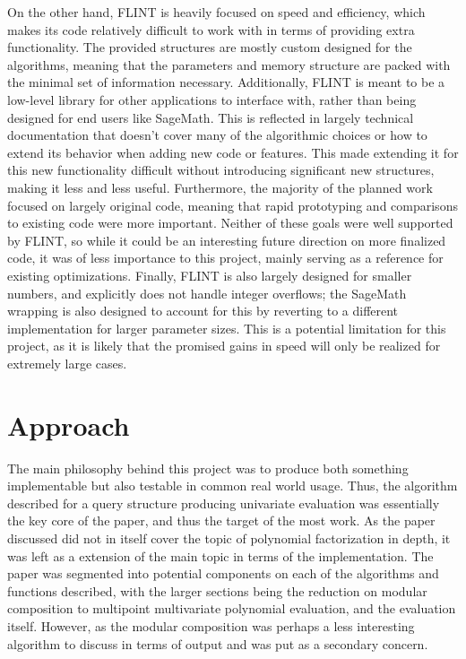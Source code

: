 \documentclass[pageno]{jpaper}
\begin{document}
On the other hand, FLINT is heavily focused on speed and efficiency, which makes its code relatively difficult to work with in terms of providing extra functionality.
The provided structures are mostly custom designed for the algorithms, meaning that the parameters and memory structure are packed with the minimal set of information necessary.
Additionally, FLINT is meant to be a low-level library for other applications to interface with, rather than being designed for end users like SageMath.
This is reflected in largely technical documentation that doesn't cover many of the algorithmic choices or how to extend its behavior when adding new code or features.
This made extending it for this new functionality difficult without introducing significant new structures, making it less and less useful.
Furthermore, the majority of the planned work focused on largely original code, meaning that rapid prototyping and comparisons to existing code were more important.
Neither of these goals were well supported by FLINT, so while it could be an interesting future direction on more finalized code, it was of less importance to this project, mainly serving as a reference for existing optimizations.
Finally, FLINT is also largely designed for smaller numbers, and explicitly does not handle integer overflows; the SageMath wrapping is also designed to account for this by reverting to a different implementation for larger parameter sizes.
This is a potential limitation for this project, as it is likely that the promised gains in speed will only be realized for extremely large cases.

\section{Approach}
The main philosophy behind this project was to produce both something implementable but also testable in common real world usage.
Thus, the algorithm described for a query structure producing univariate evaluation was essentially the key core of the paper, and thus the target of the most work.
As the paper discussed did not in itself cover the topic of polynomial factorization in depth, it was left as a extension of the main topic in terms of the implementation.
The paper was segmented into potential components on each of the algorithms and functions described, with the larger sections being the reduction on modular composition to multipoint multivariate polynomial evaluation, and the evaluation itself.
However, as the modular composition was perhaps a less interesting algorithm to discuss in terms of output and was put as a secondary concern.
\end{document}
